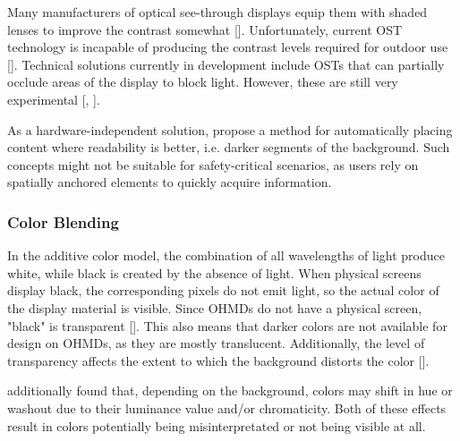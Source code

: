 Many manufacturers of optical see-through displays equip them with shaded lenses to improve the contrast somewhat [\cite{itohIndistinguishableAugmentedReality2021}]. Unfortunately, current OST technology is incapable of producing the contrast levels required for outdoor use [\cite{ericksonExploringLimitationsEnvironment2020}]. 
Technical solutions currently in development include OSTs that can partially occlude areas of the display to block light. However, these are still very experimental [\cite{kiyokawaOpticalSeethroughDisplay2000}, \cite{davariOcclusionManagementTechniques2020}].

As a hardware-independent solution, \cite{tanakaInformationLayoutMethod2008} propose a method for automatically placing content where readability is better, i.e. darker segments of the background. Such concepts might not be suitable for safety-critical scenarios, as users rely on spatially anchored elements to quickly acquire information.

\subsubsection{Color Blending}

In the additive color model, the combination of all wavelengths of light produce white, while black is created by the absence of light. When physical screens display black, the corresponding pixels do not emit light, so the actual color of the display material is visible. Since OHMDs do not have a physical screen, "black" is transparent [\cite{gabbardColorBlendingOutdoor2013}]. This also means that darker colors are not available for design on OHMDs, as they are mostly translucent. Additionally, the level of transparency affects the extent to which the background distorts the color [\cite{itohIndistinguishableAugmentedReality2021}].

\textcite{gabbardColorBlendingOutdoor2013} additionally found that, depending on the background, colors may shift in hue or washout due to their luminance value and/or chromaticity. Both of these effects result in colors potentially being misinterpretated or not being visible at all.